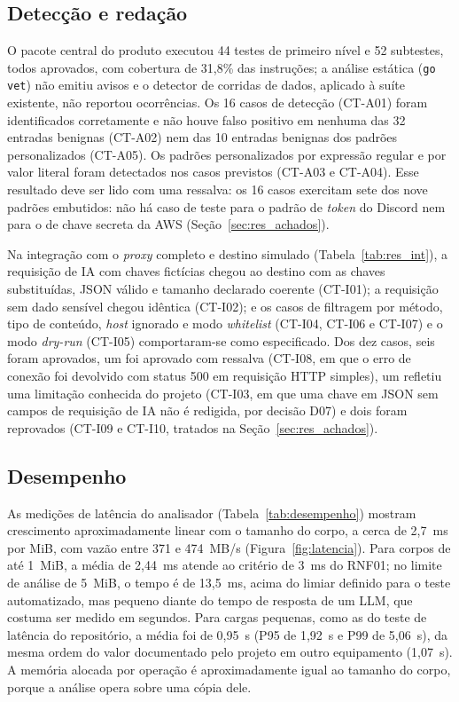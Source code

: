 \subsection{Detecção e redação}

O pacote central do produto executou 44 testes de primeiro nível e 52 subtestes, todos aprovados, com cobertura de 31,8\% das instruções; a análise estática (\texttt{go vet}) não emitiu avisos e o detector de corridas de dados, aplicado à suíte existente, não reportou ocorrências. Os 16 casos de detecção (CT-A01) foram identificados corretamente e não houve falso positivo em nenhuma das 32 entradas benignas (CT-A02) nem das 10 entradas benignas dos padrões personalizados (CT-A05). Os padrões personalizados por expressão regular e por valor literal foram detectados nos casos previstos (CT-A03 e CT-A04). Esse resultado deve ser lido com uma ressalva: os 16 casos exercitam sete dos nove padrões embutidos: não há caso de teste para o padrão de \textit{token} do Discord nem para o de chave secreta da AWS (Seção~\ref{sec:res_achados}).

Na integração com o \textit{proxy} completo e destino simulado (Tabela~\ref{tab:res_int}), a requisição de IA com chaves fictícias chegou ao destino com as chaves substituídas, JSON válido e tamanho declarado coerente (CT-I01); a requisição sem dado sensível chegou idêntica (CT-I02); e os casos de filtragem por método, tipo de conteúdo, \textit{host} ignorado e modo \textit{whitelist} (CT-I04, CT-I06 e CT-I07) e o modo \textit{dry-run} (CT-I05) comportaram-se como especificado. Dos dez casos, seis foram aprovados, um foi aprovado com ressalva (CT-I08, em que o erro de conexão foi devolvido com status 500 em requisição HTTP simples), um refletiu uma limitação conhecida do projeto (CT-I03, em que uma chave em JSON sem campos de requisição de IA não é redigida, por decisão D07) e dois foram reprovados (CT-I09 e CT-I10, tratados na Seção~\ref{sec:res_achados}).

\subsection{Desempenho}

As medições de latência do analisador (Tabela~\ref{tab:desempenho}) mostram crescimento aproximadamente linear com o tamanho do corpo, a cerca de 2,7~ms por MiB, com vazão entre 371 e 474~MB/s (Figura~\ref{fig:latencia}). Para corpos de até 1~MiB, a média de 2,44~ms atende ao critério de 3~ms do RNF01; no limite de análise de 5~MiB, o tempo é de 13,5~ms, acima do limiar definido para o teste automatizado, mas pequeno diante do tempo de resposta de um LLM, que costuma ser medido em segundos. Para cargas pequenas, como as do teste de latência do repositório, a média foi de 0,95~\textmu s (P95 de 1,92~\textmu s e P99 de 5,06~\textmu s), da mesma ordem do valor documentado pelo projeto em outro equipamento (1,07~\textmu s). A memória alocada por operação é aproximadamente igual ao tamanho do corpo, porque a análise opera sobre uma cópia dele.


